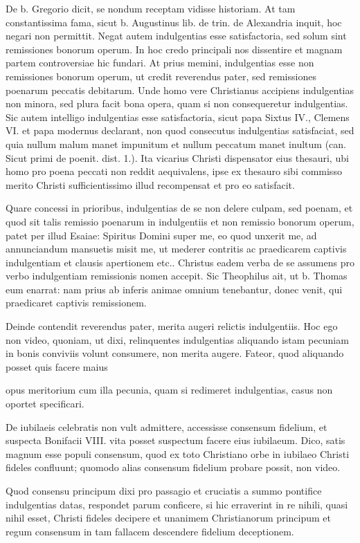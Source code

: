 De b. Gregorio dicit, se nondum receptam vidisse historiam. At tam constantissima fama, sicut b. Augustinus lib. de trin. de Alexandria inquit, hoc negari non permittit. Negat autem indulgentias esse satisfactoria, sed solum sint remissiones bonorum operum. In hoc credo principali nos dissentire et magnam partem controversiae hic fundari. At prius memini, indulgentias esse non remissiones bonorum operum, ut credit reverendus pater, \marginpar{\small[352]} sed remissiones poenarum peccatis debitarum. Unde homo vere Christianus accipiens indulgentias non minora, sed plura facit bona opera, quam si non consequeretur indulgentias. Sic autem intelligo indulgentias esse satisfactoria, sicut papa Sixtus IV., Clemens VI. et papa modernus declarant, non quod consecutus indulgentias satisfaciat, sed quia nullum malum manet impunitum et nullum peccatum manet inultum (can. Sicut primi de poenit. dist. 1.). Ita vicarius Christi dispensator eius thesauri, ubi homo pro poena peccati non reddit aequivalens, ipse ex thesauro sibi commisso merito Christi sufficientissimo illud recompensat et pro eo satisfacit.

Quare concessi in prioribus, indulgentias de se non delere culpam, sed poenam, et quod sit talis remissio poenarum in indulgentiis et non remissio bonorum operum, patet per illud Esaiae: Spiritus Domini super me, eo quod unxerit me, ad annunciandum mansuetis misit me, ut mederer contritis ac praedicarem captivis indulgentiam et clausis apertionem etc.. Christus eadem verba de se assumens pro verbo indulgentiam remissionis nomen accepit. Sic Theophilus ait, ut b. Thomas eum enarrat: nam prius ab inferis animae omnium tenebantur, donec venit, qui praedicaret captivis remissionem.

Deinde contendit reverendus pater, merita augeri relictis indulgentiis. Hoc ego non video, quoniam, ut dixi, relinquentes indulgentias aliquando istam pecuniam in bonis conviviis volunt consumere, non merita augere. Fateor, quod aliquando posset quis facere maius

opus meritorium cum illa pecunia, quam si redimeret indulgentias, casus non oportet specificari.

De iubilaeis celebratis non vult admittere, accessisse consensum fidelium, et suspecta Bonifacii VIII. vita posset suspectum facere eius iubilaeum. Dico, satis magnum esse populi consensum, quod ex toto Christiano orbe in iubilaeo Christi fideles confluunt; quomodo alias consensum fidelium probare possit, non video.

Quod consensu principum dixi pro passagio et cruciatis a summo pontifice indulgentias datas, respondet parum conficere, si hic erraverint in re nihili, quasi nihil esset, Christi fideles decipere et unanimem Christianorum principum et regum consensum in tam fallacem descendere fidelium deceptionem.

